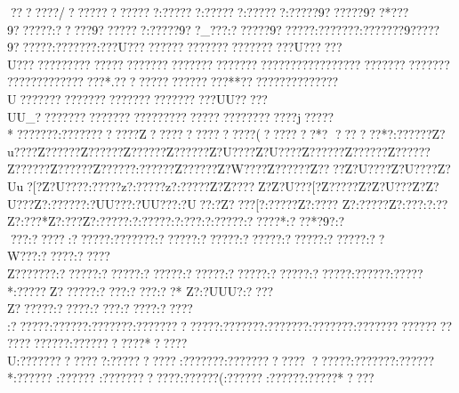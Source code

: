 {{{{{{{{{{{{{{{{{{{{{{{{{{{{{{{{{{{{{{{{{{{{{{{{{{{{{{{{{{{{{{{{{{{{{{{{{{{{{{{{{{{{{{{{{{{{{{{{{{{{{{{{{{{{{{{{{{{{{{{{{{{{{{{{{{{{{{{{{{{{{{{{{{{{{{{{{{{{{{{{{{{{{{{{{{{{{{{{{{{{{{{{{{{{{{{{{{{{{{{{{{{{{{{{{{{{{{{{{{{{{{{{{{{{{{{{{{{{{{{{{{{{{{{{{{{{{{{{{{{{{{{{{{{{{{{{{{{{{{{{{{{{{{{{{{{{{{{{{{{{{{{{{{{{{{{{{{{{{{{{{{{{{{{{{{{{{{{{{{{{{{{{{{{{{{{{{{{{{{{{{{{{{{{{{{{{{{{{{{{{{{{{{{{{{{{{{{{{{{{{{{{{{{{{{{{{{{{{{{{{{{{{{{{{{{{{{{{{{{{{{{{{{{{{{{{{{{{{{{{{{{{{{{{{{{{{{{{{{{{{{{{{{{{{{{{{{{{{{{{{{{{{{{{{{{{{{{{{{{{{{{{{{{{{{{{{{{{{{{{{{{{{{{{{{{{{{{{{{{{{{{{{{{{{{{{{{{{{{{{{{{{{{{{{{{{{{{{{{{{{{{{{{{{{{{{{{{{{{{{{{{{{{{{{{{{{{{{{{{{{{{{{{{{{{{{{{{{{{{{{{{{{{{{{{{{{{{{{{{{{{{{{{{{{{{{{{{{{{{{{{{{{{{{{{{{{{{{{{{{{{{{{{{{{{{{{{{{{{{{{{{{{{{{{{{{{{{{{{{{{{{{{{{{{{{{{{{{{{{{{{{{{{{{{{{{{{{{{{{{{{{{{{{{{{{{{{{???????/?????????????:??????:??????:??????:?????9??????9??*???9??????:?????9???????:?????9??_???:??????9??????:???????:???????9?????9??????:???????:???U??????????????????????????U??????U?????????????????????????????????????????????????????????????????????????????????????*.?????????????????**????????????????U???????????????????????????????UU?????UU_????????????????????????????????}?????????j?????*???????:????????????Z????? ????? ?????(????? ??*?
 ???   ???*  {?:?????{?Z?u???{?Z?????{?Z?????{?Z?????{?Z?????{?Z?U???{?Z?U???{?Z?????{?Z?????{?Z?????{?Z?????{?Z?????{?Z?????{?:?????{?Z?????{?Z?W???{?Z?????{?Z???{?Z?U???{?Z?U???{?Z?Uu?[?Z?U???{?:?????z?:?????z?:?????Z?Z????Z?Z?U???[?Z?????Z?Z?U???Z?Z?U???Z?:?????{?:?UU??{?:?UU??{?:?U??:?Z????[?:?????Z?:???? Z?:?????Z?:???  :?:??   Z?:???*Z?:???Z?:?????:?:?????:?:???:?:?????:?????*:???*? 9?:????:?????:??????:???????:??????:??????:??????:??????:??????:??W???:?????:?????Z???????:??????:??????:??????:??????:??????:??????:??????:?????? :?????* :????? Z??????:????  :????  :??*   Z?:?UUU?:????  Z??????:????? :???? :????? :????? :??????:?????? :???????:?????????????:???????:???????:???????:????????????? ?????? ?????? :???????????*?????U:???????????? ?:??????????:???????:??????????????????:???????:??????*:??????
:?????? :???????????? :??????(:??????:?????? :?????* ????
}}}}}}}}}}}}}}}}}}}}}}}}}}}}}}}}}}}}}}}}}}}}}}}}}}}}}}}}}}}}}}}}}}}}}}}}}}}}}}}}}}}}}}}}}}}}}}}}}}}}}}}}}}}}}}}}}}}}}}}}}}}}}}}}}}}}}}}}}}}}}}}}}}}}}}}}}}}}}}}}}}}}}}}}}}}}}}}}}}}}}}}}}}}}}}}}}}}}}}}}}}}}}}}}}}}}}}}}}}}}}}}}}}}}}}}}}}}}}}}}}}}}}}}}}}}}}}}}}}}}}}}}}}}}}}}}}}}}}}}}}}}}}}}}}}}}}}}}}}}}}}}}}}}}}}}}}}}}}}}}}}}}}}}}}}}}}}}}}}}}}}}}}}}}}}}}}}}}}}}}}}}}}}}}}}}}}}}}}}}}}}}}}}}}}}}}}}}}}}}}}}}}}}}}}}}}}}}}}}}}}}}}}}}}}}}}}}}}}}}}}}}}}}}}}}}}}}}}}}}}}}}}}}}}}}}}}}}}}}}}}}}}}}}}}}}}}}}}}}}}}}}}}}}}}}}}}}}}}}}}}}}}}}}}}}}}}}}}}}}}}}}}}}}}}}}}}}}}}}}}}}}}}}}}}}}}}}}}}}}}}}}}}}}}}}}}}}}}}}}}}}}}}}}}}}}}}}}}}}}}}}}}}}}}}}}}}}}}}}}}}}}}}}}}}}}}}}}}}}}}}}}}}}}}}}}}}}}}}}}}}}}}}}}}}}}}}}}}}}}}}}}}}}}}}}}}}}}}}}}}}}}}}}}}}}}}}}}}}}}}}}}}}}}}}}}}}}}}}}}}}}}}}}}}}}}}}}}}}}}}}}}}}}}}}}}}}}}}}}}}}}}}}}}}}}}}}}}}}}}}}}}}}}}}}}}}}}}}}}}
